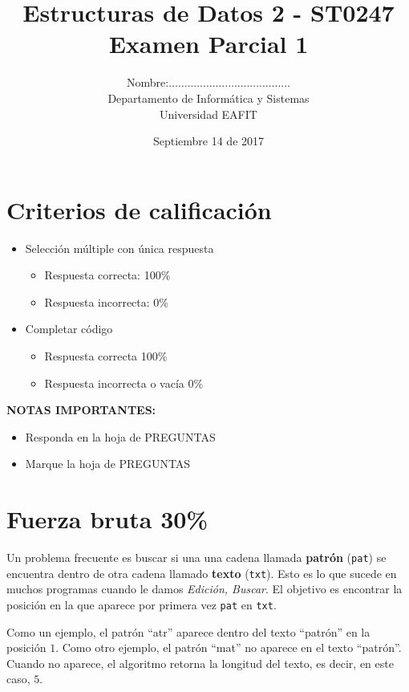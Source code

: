 \documentclass[twocolumn]{article}
\author{
Nombre:....................................... \\
    Departamento de Informática y Sistemas \\
    Universidad EAFIT \\
}
\title{
    Estructuras de Datos 2 - ST0247 \\
    Examen Parcial 1 
}
\date{
    Septiembre 14 de 2017
}
\begin{document}
\vspace{-5cm}
\maketitle


\section*{Criterios de calificación}

\begin{itemize}
\item Selección múltiple con única respuesta
\begin{itemize}
\item Respuesta correcta: 100\%
\item Respuesta incorrecta: 0\%
\end{itemize}

\item Completar código
\begin{itemize}
\item Respuesta correcta 100\%
\item Respuesta incorrecta o vacía 0\%
\end{itemize}
\end{itemize}

\vspace{1cm}

\textbf{NOTAS IMPORTANTES:}
\begin{itemize}
	\item Responda en la hoja de PREGUNTAS
	\item Marque la hoja de PREGUNTAS
\end{itemize}
\section{Fuerza bruta 30\%}
Un problema frecuente es buscar si una una cadena llamada \textbf{patrón} (\texttt{pat})
se encuentra dentro de otra cadena llamado \textbf{texto} (\texttt{txt}). Esto es lo que sucede 
en muchos programas cuando le damos \emph{Edición, Buscar}. El objetivo es
encontrar la posición en la que aparece por primera vez \texttt{pat} en \texttt{txt}.

Como un ejemplo, el patrón ``atr'' aparece dentro del texto ``patrón'' en la posición
$1$. Como otro ejemplo, el patrón ``mat'' no aparece en el texto ``patrón''. Cuando
no aparece, el algoritmo retorna la longitud del texto, es decir, en este caso, $5$.
\end{document}
